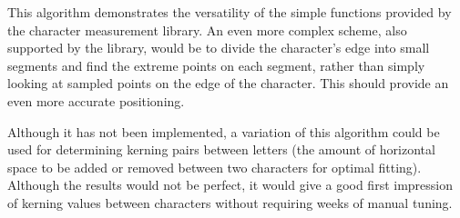This algorithm demonstrates the versatility of the simple functions provided by
the character measurement library. An even more complex scheme, also supported
by the library, would be to divide the character's edge into small segments and
find the extreme points on each segment, rather than simply looking at sampled
points on the edge of the character. This should provide an even more accurate
positioning.

Although it has not been implemented, a variation of this algorithm could be
used for determining kerning pairs between letters (the amount of horizontal
space to be added or removed between two characters for optimal fitting).
Although the results would not be perfect, it would give a good first impression
of kerning values between characters without requiring weeks of manual tuning.

